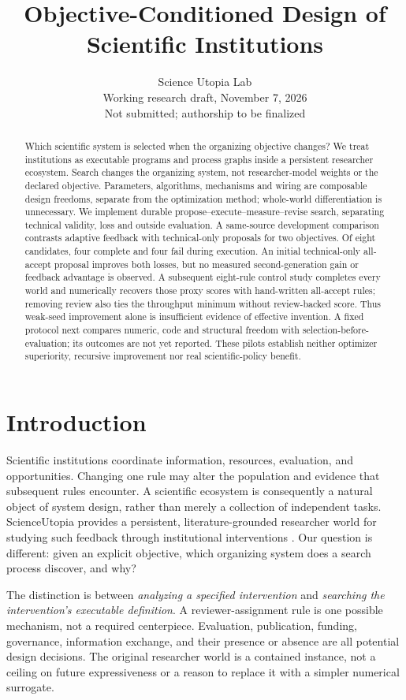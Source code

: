 \documentclass{article}
\title{Objective-Conditioned Design of Scientific Institutions}
\author{Science Utopia Lab\\Working research draft, November 7, 2026\\Not submitted; authorship to be finalized}
\begin{document}
\maketitle
\begin{abstract}
Which scientific system is selected when the organizing objective changes?
We treat institutions as executable programs and process graphs inside a
persistent researcher ecosystem. Search changes the organizing system, not
researcher-model weights or the declared objective. Parameters, algorithms,
mechanisms and wiring are composable design freedoms, separate from the
optimization method; whole-world differentiation is unnecessary. We implement
durable propose--execute--measure--revise search, separating technical validity,
loss and outside evaluation. A same-source development comparison contrasts
adaptive feedback with technical-only proposals for two objectives. Of eight
candidates, four complete and four fail during execution. An initial
technical-only all-accept proposal improves both losses, but no measured
second-generation gain or feedback advantage is observed. A subsequent
eight-rule control study completes every world and numerically recovers those
proxy scores with hand-written all-accept rules; removing review also ties the
throughput minimum without review-backed score. Thus weak-seed improvement
alone is insufficient evidence of effective invention. A fixed protocol next
compares numeric, code and structural freedom with selection-before-evaluation;
its outcomes are not yet reported. These pilots establish neither optimizer
superiority, recursive improvement nor real scientific-policy benefit.
\end{abstract}

\section{Introduction}
Scientific institutions coordinate information, resources, evaluation, and
opportunities. Changing one rule may alter the population and evidence that
subsequent rules encounter. A scientific ecosystem is consequently a natural
object of system design, rather than merely a collection of independent tasks.
ScienceUtopia provides a persistent, literature-grounded researcher world for
studying such feedback through institutional interventions
\citep{jin2026scienceutopia}. Our question is different: given an explicit
objective, which organizing system does a search process discover, and why?

The distinction is between \emph{analyzing a specified intervention} and
\emph{searching the intervention's executable definition}. A reviewer-assignment
rule is one possible mechanism, not a required centerpiece. Evaluation,
publication, funding, governance, information exchange, and their presence or
absence are all potential design decisions. The original researcher world is
a contained instance, not a ceiling on future expressiveness or a reason to
replace it with a simpler numerical surrogate.
\end{document}
